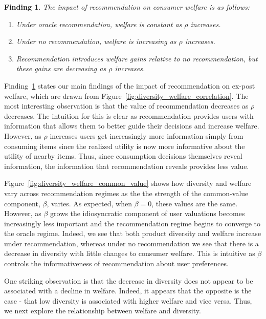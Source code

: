 \documentclass[format=acmsmall, review=false]{acmart}
\newtheorem{finding}{Finding}
\begin{document}
\begin{finding}\label{finding_welfare_gap}
The impact of recommendation on consumer welfare is as follows:
\begin{enumerate}
\item Under oracle recommendation, welfare is constant as $\rho$ increases.
\item Under no recommendation, welfare is increasing as $\rho$ increases.
\item Recommendation introduces welfare gains relative to no recommendation, but these gains are decreasing as $\rho$ increases. 
\end{enumerate}
\end{finding}
\par 
Finding~\ref{finding_welfare_gap} states our main findings of the impact of recommendation on ex-post welfare, which are drawn from Figure~\ref{fig:diversity_welfare_correlation}. The most interesting observation is that the value of recommendation decreases as $\rho$ decreases. The intuition for this is clear as recommendation provides users with information that allows them to better guide their decisions and increase welfare. However, as $\rho$ increases users get increasingly more information simply from consuming items since the realized utility is now more informative about the utility of nearby items. Thus, since consumption decisions themselves reveal information, the information that recommendation reveals provides less value.
\par 
Figure~\ref{fig:diversity_welfare_common_value} shows how diversity and welfare vary across recommendation regimes as the the strength of the common-value component, $\beta$, varies. As expected, when $\beta = 0$, these values are the same. However, as $\beta$ grows the idiosyncratic component of user valuations becomes increasingly less important and the recommendation regime begins to converge to the oracle regime. Indeed, we see that both product diversity and welfare increase under recommendation, whereas under no recommendation we see that there is a decrease in diversity with little changes to consumer welfare. This is intuitive as $\beta$ controls the informativeness of recommendation about user preferences.
\par 
One striking observation is that the decrease in diversity does not appear to be associated with a decline in welfare. Indeed, it appears that the opposite is the case - that low diversity is associated with higher welfare and vice versa. Thus, we next explore the relationship between welfare and diversity.
\end{document}
